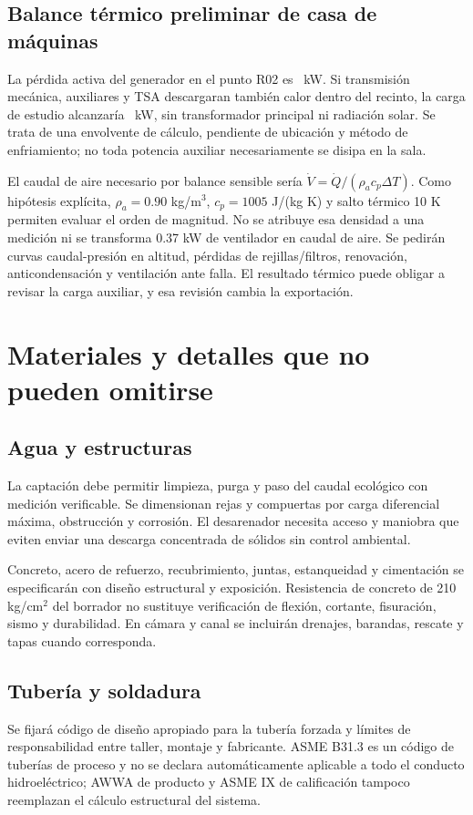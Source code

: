 \subsection{Balance térmico preliminar de casa de máquinas}
La pérdida activa del generador en el punto R02 es \PerdidaCalorGenerador\ kW. Si transmisión mecánica, auxiliares y TSA descargaran también calor dentro del recinto, la carga de estudio alcanzaría \CalorSala\ kW, sin transformador principal ni radiación solar. Se trata de una envolvente de cálculo, pendiente de ubicación y método de enfriamiento; no toda potencia auxiliar necesariamente se disipa en la sala.

El caudal de aire necesario por balance sensible sería $\dot V=\dot Q/(\rho_a c_p\Delta T)$. Como hipótesis explícita, $\rho_a=0.90$ kg/m$^3$, $c_p=1005$ J/(kg K) y salto térmico 10 K permiten evaluar el orden de magnitud. No se atribuye esa densidad a una medición ni se transforma 0.37 kW de ventilador en caudal de aire. Se pedirán curvas caudal-presión en altitud, pérdidas de rejillas/filtros, renovación, anticondensación y ventilación ante falla. El resultado térmico puede obligar a revisar la carga auxiliar, y esa revisión cambia la exportación.

\section{Materiales y detalles que no pueden omitirse}
\subsection{Agua y estructuras}
La captación debe permitir limpieza, purga y paso del caudal ecológico con medición verificable. Se dimensionan rejas y compuertas por carga diferencial máxima, obstrucción y corrosión. El desarenador necesita acceso y maniobra que eviten enviar una descarga concentrada de sólidos sin control ambiental.

Concreto, acero de refuerzo, recubrimiento, juntas, estanqueidad y cimentación se especificarán con diseño estructural y exposición. Resistencia de concreto de 210 kg/cm$^2$ del borrador no sustituye verificación de flexión, cortante, fisuración, sismo y durabilidad. En cámara y canal se incluirán drenajes, barandas, rescate y tapas cuando corresponda.

\subsection{Tubería y soldadura}
Se fijará código de diseño apropiado para la tubería forzada y límites de responsabilidad entre taller, montaje y fabricante. ASME B31.3 es un código de tuberías de proceso y no se declara automáticamente aplicable a todo el conducto hidroeléctrico; AWWA de producto y ASME IX de calificación tampoco reemplazan el cálculo estructural del sistema.

